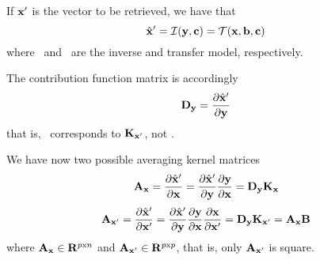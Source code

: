   If $\mathbf{x}'$ is the vector to be retrieved, we have that \citep{rodgers:90}
  \begin{equation}
    \hat{\mathbf{x}}' = \mathcal{I}(\mathbf{y},\mathbf{c}) = \mathcal{T}(\mathbf{x},\mathbf{b},\mathbf{c})
  \end{equation}
  where \im\ and \tm\ are the inverse and transfer model, respectively.

  The contribution function matrix is accordingly
  \begin{equation}
    \mathbf{D_y} =  \frac{\partial \hat{\mathbf{x}}'}{\partial \mathbf{y}}
  \end{equation}
  that is, \Dy\ corresponds to $\mathbf{K}_{\mathbf{x}'}$, not \Kx.
  
  We have now two possible averaging kernel matrices
  \begin{equation}
    \mathbf{A}_{\mathbf{x}} 
      = \frac{\partial \hat{\mathbf{x}}'}{\partial \mathbf{x}} 
      = \frac{\partial \hat{\mathbf{x}}'}{\partial \mathbf{y}} \frac{\partial \mathbf{y}}{\partial \mathbf{x}}
      = \mathbf{D_y} \mathbf{K_x}
  \end{equation}
  \begin{equation}
    \mathbf{A}_{\mathbf{x}'} 
      = \frac{\partial \hat{\mathbf{x}}'}{\partial \mathbf{x}'} 
      = \frac{\partial\hat{\mathbf{x}}'}{\partial\mathbf{y}}\frac{\partial\mathbf{y}}{\partial\mathbf{x}}
      \frac{\partial\mathbf{x}}{\partial\mathbf{x}'}
      = \mathbf{D_y} \mathbf{K}_{\mathbf{x}'}
      = \mathbf{A}_{\mathbf{x}} \mathbf{B}
  \end{equation}
  where $\mathbf{A}_{\mathbf{x}} \in {\bf R}^{p {\mathrm x} n}$ and $\mathbf{A}_{\mathbf{x}'} \in
  {\bf R}^{p {\mathrm x} p}$, that is, only $\mathbf{A}_{\mathbf{x}'}$ is square. 




